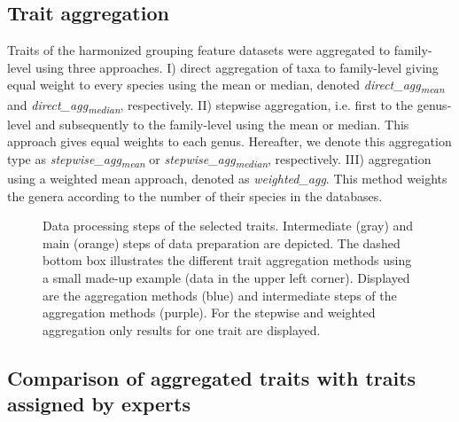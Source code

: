 \documentclass{article}
\begin{document}
\newpage



\subsection*{Trait aggregation}

Traits of the harmonized grouping feature datasets were aggregated to family-level using three approaches. I) direct aggregation of taxa to family-level giving equal weight to every species using the mean or median, denoted \textit{direct\_agg\textsubscript{mean}} and \textit{direct\_agg\textsubscript{median}}, respectively. II) stepwise aggregation, i.e. first to the genus-level and subsequently to the family-level using the mean or median. This approach gives equal weights to each genus. Hereafter, we denote this aggregation type as \textit{stepwise\_agg\textsubscript{mean}} or \textit{stepwise\_agg\textsubscript{median}}, respectively. III) aggregation using a weighted mean approach, denoted as \textit{weighted\_agg}. This method weights the genera according to the number of their species in the databases. 

\begin{figure}
  \centering
  
  \caption{Data processing steps of the selected traits. Intermediate (gray) and main (orange) steps of data preparation are depicted. The dashed bottom box illustrates the different trait aggregation methods using a small made-up example (data in the upper left corner). Displayed are the aggregation methods (blue) and intermediate steps of the aggregation methods (purple). For the stepwise and weighted aggregation only results for one trait are displayed.}
\end{figure}



\subsection*{Comparison of aggregated traits with traits assigned by experts}
\end{document}
